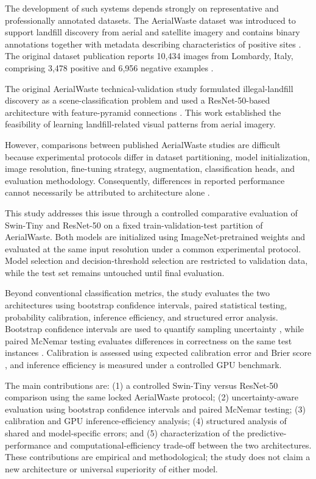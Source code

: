 \documentclass[journal]{IEEEtran}
\begin{document}
The development of such systems depends strongly on representative and professionally annotated datasets. The AerialWaste dataset was introduced to support landfill discovery from aerial and satellite imagery and contains binary annotations together with metadata describing characteristics of positive sites \cite{torres2023aerialwaste}. The original dataset publication reports 10,434 images from Lombardy, Italy, comprising 3,478 positive and 6,956 negative examples \cite{torres2023aerialwaste}.

The original AerialWaste technical-validation study formulated illegal-landfill discovery as a scene-classification problem and used a ResNet-50-based architecture with feature-pyramid connections \cite{torres2021illegal}. This work established the feasibility of learning landfill-related visual patterns from aerial imagery.

However, comparisons between published AerialWaste studies are difficult because experimental protocols differ in dataset partitioning, model initialization, image resolution, fine-tuning strategy, augmentation, classification heads, and evaluation methodology. Consequently, differences in reported performance cannot necessarily be attributed to architecture alone \cite{gibellini2025pipeline,sharmily2025landfill,anvith2026secbam}.

This study addresses this issue through a controlled comparative evaluation of Swin-Tiny and ResNet-50 on a fixed train-validation-test partition of AerialWaste. Both models are initialized using ImageNet-pretrained weights and evaluated at the same input resolution under a common experimental protocol. Model selection and decision-threshold selection are restricted to validation data, while the test set remains untouched until final evaluation.

Beyond conventional classification metrics, the study evaluates the two architectures using bootstrap confidence intervals, paired statistical testing, probability calibration, inference efficiency, and structured error analysis. Bootstrap confidence intervals are used to quantify sampling uncertainty \cite{efron1993bootstrap}, while paired McNemar testing evaluates differences in correctness on the same test instances \cite{dietterich1998tests}. Calibration is assessed using expected calibration error and Brier score \cite{guo2017calibration}, and inference efficiency is measured under a controlled GPU benchmark.

The main contributions are: (1) a controlled Swin-Tiny versus ResNet-50 comparison using the same locked AerialWaste protocol; (2) uncertainty-aware evaluation using bootstrap confidence intervals and paired McNemar testing; (3) calibration and GPU inference-efficiency analysis; (4) structured analysis of shared and model-specific errors; and (5) characterization of the predictive-performance and computational-efficiency trade-off between the two architectures. These contributions are empirical and methodological; the study does not claim a new architecture or universal superiority of either model.
\end{document}
